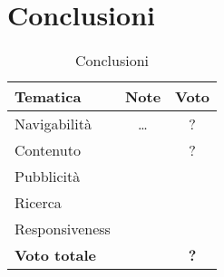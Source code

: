 
\section{Conclusioni}

	\begin{table}
		\centering
		\begin{tabular}[width=\textwidth]{lcc}
			\toprule
			\textbf{Tematica} & \textbf{Note} & \textbf{Voto} \\
			\toprule
			
			Navigabilità & \dots & ? \\
			\midrule
			Contenuto & & ? \\
			\midrule
			Pubblicità & & \\
			\midrule
			Ricerca & & \\
			\midrule
			Responsiveness & & \\
			\midrule
			\textbf{Voto totale} & & \textbf{?} \\	
			\bottomrule
			
		\end{tabular}
		\caption{Conclusioni}
		\label{tab:Conclusioni}
	\end{table}